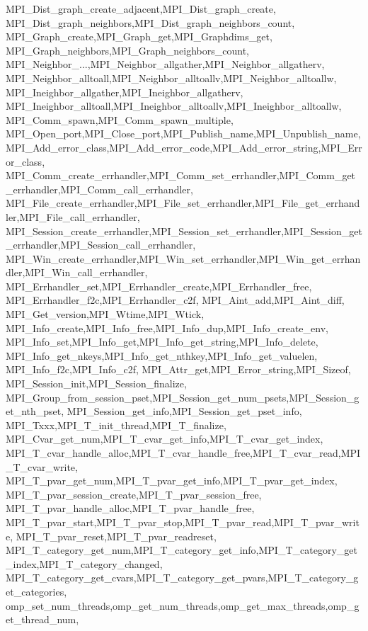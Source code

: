 {{{{{    MPI_Dist_graph_create_adjacent,MPI_Dist_graph_create,
    MPI_Dist_graph_neighbors,MPI_Dist_graph_neighbors_count,
    MPI_Graph_create,MPI_Graph_get,MPI_Graphdims_get,
    MPI_Graph_neighbors,MPI_Graph_neighbors_count,
    MPI_Neighbor_...,MPI_Neighbor_allgather,MPI_Neighbor_allgatherv,
    MPI_Neighbor_alltoall,MPI_Neighbor_alltoallv,MPI_Neighbor_alltoallw,
    MPI_Ineighbor_allgather,MPI_Ineighbor_allgatherv,
    MPI_Ineighbor_alltoall,MPI_Ineighbor_alltoallv,MPI_Ineighbor_alltoallw,
    MPI_Comm_spawn,MPI_Comm_spawn_multiple,
    MPI_Open_port,MPI_Close_port,MPI_Publish_name,MPI_Unpublish_name,
    MPI_Add_error_class,MPI_Add_error_code,MPI_Add_error_string,MPI_Error_class,
    MPI_Comm_create_errhandler,MPI_Comm_set_errhandler,MPI_Comm_get_errhandler,MPI_Comm_call_errhandler,
    MPI_File_create_errhandler,MPI_File_set_errhandler,MPI_File_get_errhandler,MPI_File_call_errhandler,
    MPI_Session_create_errhandler,MPI_Session_set_errhandler,MPI_Session_get_errhandler,MPI_Session_call_errhandler,
    MPI_Win_create_errhandler,MPI_Win_set_errhandler,MPI_Win_get_errhandler,MPI_Win_call_errhandler,
    MPI_Errhandler_set,MPI_Errhandler_create,MPI_Errhandler_free,
    MPI_Errhandler_f2c,MPI_Errhandler_c2f,
    MPI_Aint_add,MPI_Aint_diff,
    MPI_Get_version,MPI_Wtime,MPI_Wtick,
    MPI_Info_create,MPI_Info_free,MPI_Info_dup,MPI_Info_create_env,
    MPI_Info_set,MPI_Info_get,MPI_Info_get_string,MPI_Info_delete,
    MPI_Info_get_nkeys,MPI_Info_get_nthkey,MPI_Info_get_valuelen,
    MPI_Info_f2c,MPI_Info_c2f,
    MPI_Attr_get,MPI_Error_string,MPI_Sizeof,
    MPI_Session_init,MPI_Session_finalize,
    MPI_Group_from_session_pset,MPI_Session_get_num_psets,MPI_Session_get_nth_pset,
    MPI_Session_get_info,MPI_Session_get_pset_info,
    MPI_Txxx,MPI_T_init_thread,MPI_T_finalize,
    MPI_Cvar_get_num,MPI_T_cvar_get_info,MPI_T_cvar_get_index,
    MPI_T_cvar_handle_alloc,MPI_T_cvar_handle_free,MPI_T_cvar_read,MPI_T_cvar_write,
    MPI_T_pvar_get_num,MPI_T_pvar_get_info,MPI_T_pvar_get_index,
    MPI_T_pvar_session_create,MPI_T_pvar_session_free,
    MPI_T_pvar_handle_alloc,MPI_T_pvar_handle_free,
    MPI_T_pvar_start,MPI_T_pvar_stop,MPI_T_pvar_read,MPI_T_pvar_write,
    MPI_T_pvar_reset,MPI_T_pvar_readreset,
    MPI_T_category_get_num,MPI_T_category_get_info,MPI_T_category_get_index,MPI_T_category_changed,
    MPI_T_category_get_cvars,MPI_T_category_get_pvars,MPI_T_category_get_categories,
    omp_set_num_threads,omp_get_num_threads,omp_get_max_threads,omp_get_thread_num,
}}}}}
